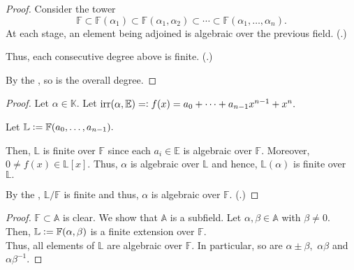 \adjoinalgsfinext*\label{prop:adjoinalgsfinext2}
\begin{flushright}\hyperref[prop:adjoinalgsfinext]{\upsym}\end{flushright}
\begin{proof}
    Consider the tower
    \begin{equation*} 
        \mathbb{F} \subset \mathbb{F}(\alpha_1) \subset \mathbb{F}(\alpha_1, \alpha_2) \subset \cdots \subset \mathbb{F}(\alpha_1, \ldots, \alpha_n).
    \end{equation*}
    At each stage, an element being adjoined is algebraic over the previous field. (.)

    Thus, each consecutive degree above is finite. (.)

    By the , so is the overall degree.
\end{proof}

\compalgisalg*\label{cor:compalgisalg2}
\begin{flushright}\hyperref[cor:compalgisalg]{\upsym}\end{flushright}
\begin{proof}
    Let $\alpha \in \mathbb{K}.$ Let $\operatorname{irr}(\alpha, \mathbb{E}) =\vcentcolon f(x) = a_0 + \cdots + a_{n - 1}x^{n - 1} + x^n.$

    Let $\mathbb{L} \vcentcolon= \mathbb{F}(a_0, \ldots, a_{n - 1}).$

    Then, $\mathbb{L}$ is finite over $\mathbb{F}$ since each $a_i \in \mathbb{E}$ is algebraic over $\mathbb{F}.$ Moreover, $0 \neq f(x) \in \mathbb{L}[x].$ Thus, $\alpha$ is algebraic over $\mathbb{L}$ and hence, $\mathbb{L}(\alpha)$ is finite over $\mathbb{L}.$

    By the , $\mathbb{L}/\mathbb{F}$ is finite and thus, $\alpha$ is algebraic over $\mathbb{F}.$ (.)
\end{proof}

\algclosureisfield*\label{cor:algclosureisfield2}
\begin{flushright}\hyperref[cor:algclosureisfield]{\upsym}\end{flushright}
\begin{proof}
    $\mathbb{F} \subset \mathbb{A}$ is clear. We show that $\mathbb{A}$ is a subfield. Let $\alpha, \beta \in \mathbb{A}$ with $\beta \neq 0.$ Then, $\mathbb{L} \vcentcolon= \mathbb{F}(\alpha, \beta)$ is a finite extension over $\mathbb{F}.$ \\
    Thus, all elements of $\mathbb{L}$ are algebraic over $\mathbb{F}.$ In particular, so are $\alpha \pm \beta,$ $\alpha\beta$ and $\alpha\beta^{-1}.$
\end{proof}

